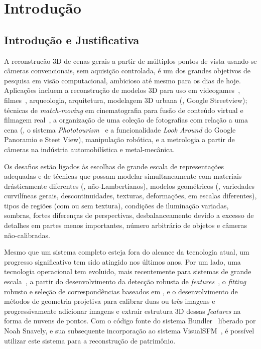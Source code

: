 \chapter*{Introdução} \label{cap:intro}

\section{Introdução e Justificativa}

A reconstrucão 3D de cenas gerais a partir de múltiplos pontos de vista
usando-se câmeras convencionais, sem aquisição controlada, é um dos grandes
objetivos de pesquisa em visão computacional, ambicioso até mesmo para os dias
de hoje. Aplicações incluem a reconstrução de modelos 3D para uso em
videogames~\cite{ablan2007digital}, filmes~\cite{ablan2007digital},
arqueologia, arquitetura, modelagem 3D urbana (\eg, Google Streetview); técnicas
de \emph{match-moving} em cinematografia para fusão de conteúdo virtual e
filmagem real~\cite{dobbert2012matchmoving}, a organização de uma coleção de
fotografias com relação a uma cena (\eg, o sistema
\emph{Phototourism}~\cite{agarwal2010reconstructing} e a funcionalidade
\emph{Look Around} do Google Panoramio e Steet View), manipulação robótica, e a
metrologia a partir de câmeras na indústria automobilística e metal-mecânica.

Os desafios estão ligados às escolhas de grande escala de
representações adequadas e de técnicas que possam modelar simultaneamente com
materiais drásticamente diferentes (\eg, não-Lambertianos), modelos
geométricos (\eg, variedades curvilíneas gerais, descontinuidades, texturas,
deformações, em escalas diferentes), tipos de regiões (com ou sem textura),
condições de iluminação variadas, sombras, fortes diferenças de perspectivas,
desbalanceamento devido a excesso de detalhes em partes menos importantes,
número arbitrário de objetos e câmeras não-calibradas.

Mesmo que um sistema completo esteja fora do alcance da tecnologia atual,
um progresso significativo tem sido atingido nos últimos anos. Por um lado,
uma tecnologia operacional tem evoluido, mais recentemente para sistemas de grande
escala~\cite{agarwal2011building},
a partir do desenvolvimento da detecção robusta de
\emph{features}~\cite{mikolajczyk2002detection}, o
\emph{fitting} robusto e seleção de correspondências baseados em \ransac, e o
desenvolvimento de métodos de geometria projetiva para calibrar duas ou três
imagens e progressivamente adicionar imagens e extrair estrutura 3D dessas
\emph{features} na forma de nuvens de pontos. Com o código fonte do sistema
Bundler~\cite{Nsnavely2010bundler} liberado por Noah Snavely, e sua subsequente incorporação
ao sistema VisualSFM~\cite{wu2011visualsfm}, é possível utilizar este sistema para a
reconstrução de patrimônio. 


